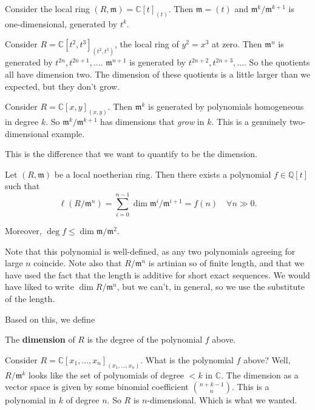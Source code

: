 \begin{example} 
Consider the local ring $(R, \mathfrak{m}) = \mathbb{C}[t]_{(t)}$. Then $\mathfrak{m} = (t)$ and
$\mathfrak{m}^k/\mathfrak{m}^{k+1}$ is one-dimensional, generated by $t^k$.
\end{example} 

\begin{example} 
Consider $R = \mathbb{C}[t^2, t^3]_{(t^2, t^3)}$, the local ring of $y^2 = x^3$
at zero. Then $\mathfrak{m}^n$ is generated by $t^{2n}, t^{2n+1}, \dots$.
$\mathfrak{m}^{n+1}$ is generated by $t^{2n+2}, t^{2n+3}, \dots$. So the
quotients all have dimension two. The dimension of these quotients is a little
larger than we expected, but they don't grow.
\end{example} 

\begin{example} 
Consider $R = \mathbb{C}[x,y]_{(x,y)}$. Then $\mathfrak{m}^k$ is generated by
polynomials homogeneous in degree $k$. So $\mathfrak{m}^k/\mathfrak{m}^{k+1}$
has dimensions that \emph{grow} in $k$. This is a genuinely two-dimensional
example. 
\end{example} 

This is the difference that we want to quantify to be the dimension.

\begin{proposition} 
Let $(R, \mathfrak{m})$ be a local noetherian ring. Then there exists a
polynomial
$f \in \mathbb{Q}[t]$ such that
\[ \ell(R/\mathfrak{m}^n) = \sum_{i=0}^{n-1} \dim
\mathfrak{m}^i/\mathfrak{m}^{i+1} =  f(n)\quad \forall n \gg 0.  \]

Moreover, $\deg f \leq \dim \mathfrak{m}/\mathfrak{m}^2$.
\end{proposition} 


Note that this polynomial is well-defined, as any two polynomials agreeing for large $n$
coincide. Note also that $R/\mathfrak{m}^n$ is artinian so of finite length,
and that we have used the fact that the length is additive for short exact
sequences. We would have liked to write $\dim R/\mathfrak{m}^n$, but we can't,
in general, so we use the substitute of the length. 

Based on this, we define
\begin{definition} 
The \textbf{dimension} of $R$ is the degree of the polynomial $f$ above.
\end{definition} 

\begin{example} 
Consider $R = \mathbb{C}[x_1, \dots, x_n]_{(x_1, \dots, x_n)}$. What is the
polynomial $f$ above? Well, $R/\mathfrak{m}^k$ looks like the set of
polynomials of degree $<k$ in $\mathbb{C}$. The dimension as a vector space is
given by some binomial coefficient $\binom{n+k-1}{n}$. This is a polynomial in
$k$ of degree $n$.  So $R$ is $n$-dimensional. 
Which is what we wanted.
\end{example} 

